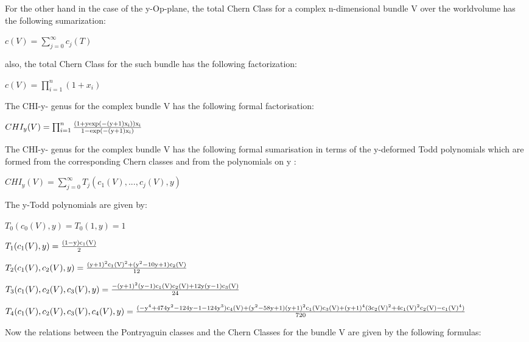 \documentclass[a4paper,a4paper]{article}
\begin{document}
For the other hand in the case of the y-Op-plane, the total Chern Class for a  complex n-dimensional bundle V over the worldvolume has the following sumarization:
\begin{center}
{  $ c(V) = \sum_{j=0}^{\infty}c_j(T) $ }
\end{center} 
also, the total Chern Class for the such bundle has the following factorization:

\begin{center}
{  $ c(V) = \prod_{i=1}^{n}(1+x_i)$ }
\end{center}
The  CHI-y- genus for the complex bundle V has the following formal factorisation:
\begin{center}
{  $ CHI_y(V) = \prod_{i=1}^n\frac{\rm(1+yexp(-(y+1)x_i))x_i }{\rm 1-exp(-(y+1)x_i)}$ }
\end{center}

The CHI-y- genus for the complex bundle V has the following formal sumarisation in terms of the y-deformed Todd polynomials which are formed from the corresponding Chern classes and from the polynomials on y :
\begin{center}
{  $CHI_y(V)  = \sum_{j=0}^{\infty}T_j(c_1(V),...,c_j(V),y) $ }
\end{center}

The y-Todd  polynomials are given by:
\begin{center}
{  $ T_0(c_0(V),y) =T _0(1,y)=1 $ }
\end{center}
\begin{center}
{  $ T_1(c_1(V),y) = \frac{\rm (1-y)c_1(V)}{\rm 2} $ }
\end{center}
\begin{center}
{  $ T_2(c_1(V),c_2(V),y) = \frac{\rm (y+1)^2c_1(V)^2+(y^2-10y+1)c_2(V)}{\rm 12} $ }
\end{center}
\begin{center}
{  $ T_3(c_1(V),c_2(V),c_3(V),y) = \frac{\rm -(y+1)^2(y-1)c_1(V)c_2(V)+12y(y-1)c_3(V)}{\rm 24} $ }
\end{center}
\begin{center}
{  $ T_4(c_1(V),c_2(V),c_3(V),c_4(V),y) = \frac{\rm (-y^4+474y^2-124y-1-124y^3)c_4(V)+(y^2-58y+1)(y+1)^2c_1(V)c_3(V)+(y+1)^4(3c_2(V)^2+4c_1(V)^2c_2(V)-c_1(V)^4)}{\rm 720} $ }
\end{center}

Now the relations between the Pontryaguin classes and the Chern Classes for the bundle V are given by the following formulas:
\end{document}

